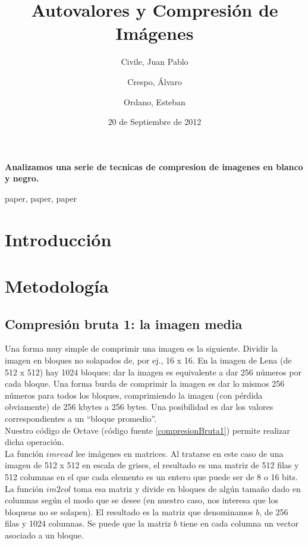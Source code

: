 \documentclass[twocolumn,a4paper,10pt]{article}
\title{Autovalores y Compresión de Imágenes}
\date{20 de Septiembre de 2012}
\author{Civile, Juan Pablo \and Crespo, Álvaro \and Ordano, Esteban }
\begin{document}
\pagestyle{fancy}
\maketitle
\thispagestyle{fancy}

\begin{customabstract}
\textbf{
    Analizamos una serie de tecnicas de compresion de imagenes en blanco y negro.
}
\end{customabstract}

\begin{keywords}
paper, paper, paper
\end{keywords}


\section{Introducci\'on}


\section{Metodología}

\subsection{Compresi\'on bruta 1: la imagen media}
\label{sec:compresion1}

Una forma muy simple de comprimir una imagen es la siguiente. Dividir la imagen en bloques no solapados de, por ej., 16 x 16. En la imagen de Lena (de 512 x 512) 
hay 1024 bloques: dar la imagen es equivalente a dar 256 n\'umeros por cada bloque. Una forma burda de comprimir la imagen es dar lo mismos 256 n\'umeros para todos 
los bloques, comprimiendo la imagen (con p\'erdida obviamente) de 256 kbytes a 256 bytes. Una posibilidad es dar los valores correspondientes a un ``bloque promedio''.\\

Nuestro c\'odigo de Octave (c\'odigo fuente \ref{compresionBruta1}) permite realizar dicha operaci\'on. \\

La funci\'on $imread$ lee im\'agenes en matrices. Al tratarse en este caso de una imagen de 512 x 512 en escala de grises, el resultado es una matriz de 512 filas y 
512 columnas en el que cada elemento es un entero que puede ser de 8 o 16 bits. La funci\'on $im2col$ toma esa matriz y divide en bloques de alg\'un tamaño dado en 
columnas seg\'un el modo que se desee (en nuestro caso, nos interesa que los bloqueas no se solapen). El resultado es la matriz que denominamos $b$, de 256 filas y 
1024 columnas. Se puede que la matriz $b$ tiene en cada columna un vector asociado a un bloque.  \\
\end{document}
